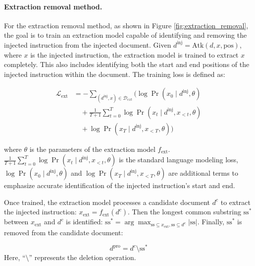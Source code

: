 \paragraph{Extraction removal method.}
For the extraction removal method, as shown in Figure \ref{fig:extraction_removal}, the goal is to train an extraction model capable of identifying and removing the injected instruction from the injected document.
Given  $d^{\text{inj}} =\text{Atk}(d, x, \text{pos})$, where  $x$  is the injected instruction, the extraction model is trained to extract  $x$  completely. This also includes identifying both the start and end positions of the injected instruction within the document. The training loss is defined as:

\begin{align}
\mathcal{L}_\text{ext} &= - \sum_{(d^{\text{inj}},x) \in \mathcal{D}_{ext}} \bigg( \log \Pr(x_0 \mid d^{\text{inj}}, \theta) \nonumber \\
&\quad + \frac{1}{T+1}\sum_{t=0}^T \log \Pr(x_t \mid d^{\text{inj}}, x_{<t}, \theta) \nonumber \\ 
    &\quad+ \log \Pr(x_T \mid d^{\text{inj}}, x_{<T}, \theta) \bigg)
\end{align}

where $\theta$ is the parameters of the extraction model $f_{\text{ext}}$.  $\frac{1}{T+1} \sum_{t=0}^T \log \Pr(x_t \mid d^{\text{inj}}, x_{<t}, \theta)$  is the standard language modeling loss,  $\log \Pr(x_0 \mid d^{\text{inj}}, \theta)$ and   $\log \Pr(x_T \mid d^{\text{inj}}, x_{<T}, \theta)$  are additional terms to emphasize accurate identification of the injected instruction’s start and end.


Once trained, the extraction model processes a candidate document  $d^c$  to extract the injected instruction: $x_{\text{ext}} = f_{\text{ext}}(d^c)$. Then the longest common substring  $\text{ss}^*$  between  $x_{\text{ext}}$ and  $d^c$  is identified:  $\text{ss}^* = \arg\max_{\text{ss} \subseteq x_{\text{ext}}, \text{ss} \subseteq d^c} |\text{ss}|$. Finally,  $\text{ss}^*$  is removed from the candidate document:

\begin{equation}
    d^{\text{pro}} =  d^c \setminus \text{ss}^*
\end{equation}
Here,  ``$\setminus$''  represents the deletion operation.


